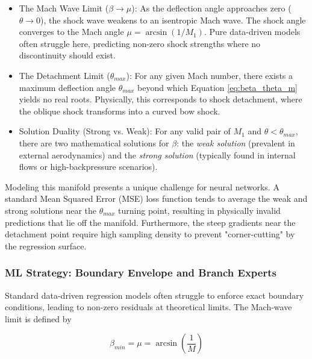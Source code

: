 \documentclass[preprint,12pt]{elsarticle}
\begin{document}
\begin{itemize}
    \item The Mach Wave Limit ($\beta \to \mu$): As the deflection angle approaches zero ($\theta \to 0$), the shock wave weakens to an isentropic Mach wave. The shock angle converges to the Mach angle $\mu = \arcsin(1/M_1)$. Pure data-driven models often struggle here, predicting non-zero shock strengths where no discontinuity should exist.
    
    \item The Detachment Limit ($\theta_{max}$): For any given Mach number, there exists a maximum deflection angle $\theta_{max}$ beyond which Equation \ref{eq:beta_theta_m} yields no real roots. Physically, this corresponds to shock detachment, where the oblique shock transforms into a curved bow shock. 
    
    \item Solution Duality (Strong vs. Weak): For any valid pair of $M_1$ and $\theta < \theta_{max}$, there are two mathematical solutions for $\beta$: the \textit{weak solution} (prevalent in external aerodynamics) and the \textit{strong solution} (typically found in internal flows or high-backpressure scenarios).
\end{itemize}

Modeling this manifold presents a unique challenge for neural networks. A standard Mean Squared Error (MSE) loss function tends to average the weak and strong solutions near the $\theta_{max}$ turning point, resulting in physically invalid predictions that lie off the manifold. Furthermore, the steep gradients near the detachment point require high sampling density to prevent "corner-cutting" by the regression surface. 


\subsubsection{ML Strategy: Boundary Envelope and Branch Experts}

Standard data-driven regression models often struggle to enforce exact boundary conditions, leading to non-zero residuals at theoretical limits. The Mach-wave limit is defined by

\begin{equation}
    \beta_{min} = \mu = \arcsin\left(\frac{1}{M}\right)
\end{equation}
\end{document}
